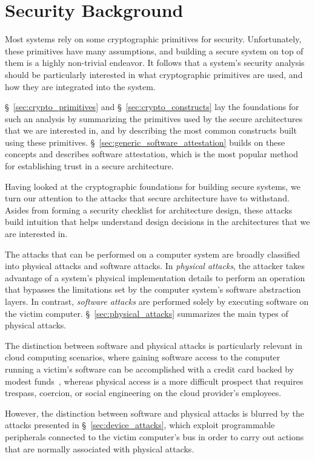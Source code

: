 \section{Security Background}
\label{sec:security_background}

Most systems rely on some cryptographic primitives for security. Unfortunately,
these primitives have many assumptions, and building a secure system on top of
them is a highly non-trivial endeavor. It follows that a system's security
analysis should be particularly interested in what cryptographic primitives are
used, and how they are integrated into the system.

\S~\ref{sec:crypto_primitives} and \S~\ref{sec:crypto_constructs} lay the
foundations for such an analysis by summarizing the primitives used by the
secure architectures that we are interested in, and by describing the most
common constructs built using these primitives.
\S~\ref{sec:generic_software_attestation} builds on these concepts and
describes software attestation, which is the most popular method for
establishing trust in a secure architecture.

Having looked at the cryptographic foundations for building secure systems, we
turn our attention to the attacks that secure architecture have to withstand.
Asides from forming a security checklist for architecture design, these attacks
build intuition that helps understand design decisions in the architectures
that we are interested in.

The attacks that can be performed on a computer system are broadly classified
into physical attacks and software attacks. In \textit{physical attacks}, the
attacker takes advantage of a system's physical implementation details to
perform an operation that bypasses the limitations set by the computer
system's software abstraction layers. In contrast, \textit{software attacks}
are performed solely by executing software on the victim computer.
\S~\ref{sec:physical_attacks} summarizes the main types of physical attacks.

The distinction between software and physical attacks is particularly relevant
in cloud computing scenarios, where gaining software access to the computer
running a victim's software can be accomplished with a credit card backed by
modest funds~\cite{ristenpart2009colocation}, whereas physical access is a
more difficult prospect that requires trespass, coercion, or social engineering
on the cloud provider's employees.

However, the distinction between software and physical attacks is blurred by
the attacks presented in \S~\ref{sec:device_attacks}, which exploit
programmable peripherals connected to the victim computer's bus in order to
carry out actions that are normally associated with physical attacks.

